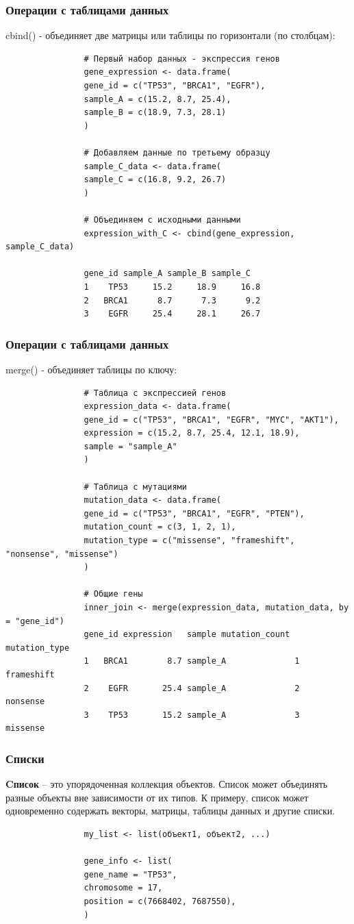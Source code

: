 \documentclass[11pt,a4paper]{beamer}
\begin{document}
	
	\begin{frame}[fragile]
		\frametitle{Операции с таблицами данных}
		cbind() - объединяет две матрицы или таблицы по горизонтали (по столбцам):
		{\fontsize{7}{8}\selectfont	
			\begin{verbatim}
				# Первый набор данных - экспрессия генов
				gene_expression <- data.frame(
				gene_id = c("TP53", "BRCA1", "EGFR"),
				sample_A = c(15.2, 8.7, 25.4),
				sample_B = c(18.9, 7.3, 28.1)
				)
				
				# Добавляем данные по третьему образцу
				sample_C_data <- data.frame(
				sample_C = c(16.8, 9.2, 26.7)
				)
				
				# Объединяем с исходными данными
				expression_with_C <- cbind(gene_expression, sample_C_data)
				
				gene_id sample_A sample_B sample_C
				1    TP53     15.2     18.9     16.8
				2   BRCA1      8.7      7.3      9.2
				3    EGFR     25.4     28.1     26.7		
			\end{verbatim}
		}	
		
	\end{frame}
	
	\begin{frame}[fragile]
		\frametitle{Операции с таблицами данных}
		merge() - объединяет таблицы по ключу:
		{\fontsize{7}{8}\selectfont	
			\begin{verbatim}
				# Таблица с экспрессией генов
				expression_data <- data.frame(
				gene_id = c("TP53", "BRCA1", "EGFR", "MYC", "AKT1"),
				expression = c(15.2, 8.7, 25.4, 12.1, 18.9),
				sample = "sample_A"
				)
				
				# Таблица с мутациями
				mutation_data <- data.frame(
				gene_id = c("TP53", "BRCA1", "EGFR", "PTEN"),
				mutation_count = c(3, 1, 2, 1),
				mutation_type = c("missense", "frameshift", "nonsense", "missense")
				)
				
				# Общие гены
				inner_join <- merge(expression_data, mutation_data, by = "gene_id")
				gene_id expression   sample mutation_count mutation_type
				1   BRCA1        8.7 sample_A              1    frameshift
				2    EGFR       25.4 sample_A              2      nonsense
				3    TP53       15.2 sample_A              3      missense	
			\end{verbatim}
		}	
		
	\end{frame}
	
	\begin{frame}[fragile]
		\frametitle{Списки}
		\textbf{Cписок} – это упорядоченная коллекция объектов. Список может объединять разные объекты вне зависимости от их типов. К примеру, список может одновременно содержать векторы, матрицы, таблицы данных и другие списки.
		{\fontsize{9}{10}\selectfont
			\begin{verbatim}
				my_list <- list(объект1, объект2, ...)
				
				gene_info <- list(
				gene_name = "TP53",
				chromosome = 17,
				position = c(7668402, 7687550),
				)
			\end{verbatim}
		}
	\end{frame}
	
\end{document}
